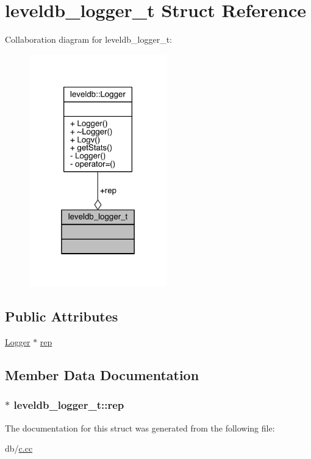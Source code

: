 \hypertarget{structleveldb__logger__t}{}\section{leveldb\+\_\+logger\+\_\+t Struct Reference}
\label{structleveldb__logger__t}


Collaboration diagram for leveldb\+\_\+logger\+\_\+t\+:
\nopagebreak
\begin{figure}[H]
\begin{center}
\leavevmode
\includegraphics[width=169pt]{structleveldb__logger__t__coll__graph}
\end{center}
\end{figure}
\subsection*{Public Attributes}
\begin{DoxyCompactItemize}
\item 
\hyperlink{classleveldb_1_1_logger}{Logger} $\ast$ \hyperlink{structleveldb__logger__t_aa27dd9e07077dbde7b776c8f548c749b}{rep}
\end{DoxyCompactItemize}


\subsection{Member Data Documentation}
\hypertarget{structleveldb__logger__t_aa27dd9e07077dbde7b776c8f548c749b}{}
\subsubsection[{rep}]{$\ast$ leveldb\+\_\+logger\+\_\+t\+::rep}\label{structleveldb__logger__t_aa27dd9e07077dbde7b776c8f548c749b}


The documentation for this struct was generated from the following file\+:\begin{DoxyCompactItemize}
\item 
db/\hyperlink{c_8cc}{c.\+cc}\end{DoxyCompactItemize}
